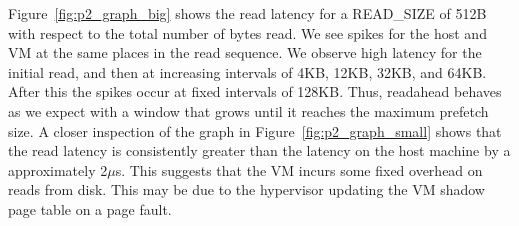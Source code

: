 Figure~\ref{fig:p2_graph_big} shows the read latency for a READ\_SIZE of 512B with
respect to the total number of bytes read. We see spikes for the host and VM at the
same places in the read sequence. We observe high latency for the initial read, and
then at increasing intervals of 4KB, 12KB, 32KB, and 64KB. After this the spikes 
occur at fixed intervals of 128KB. Thus, readahead behaves as we expect with a
window that grows until it reaches the maximum prefetch size. 
A closer inspection of the graph in Figure~\ref{fig:p2_graph_small} shows that the 
read latency is consistently greater than the latency on the host machine by a 
approximately 2$\mu$s. This suggests that the VM incurs some fixed overhead on 
reads from disk. This may be due to the hypervisor updating the VM shadow page 
table on a page fault.




